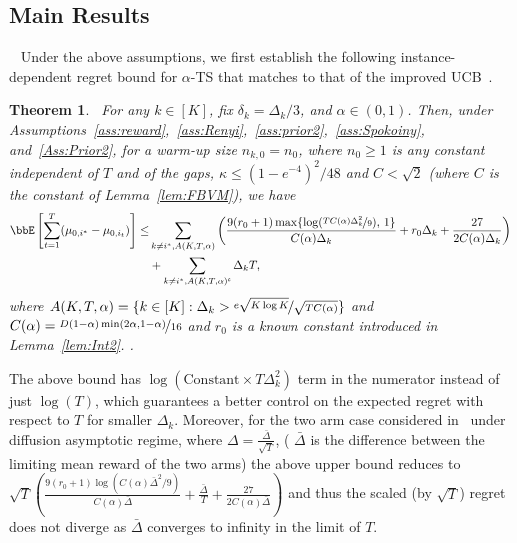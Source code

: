\documentclass[11pt]{article}
\newtheorem{theorem}{Theorem}
\begin{document}
\subsection{Main Results}~\label{sec:Main Results}
        Under the above assumptions, we first establish the following instance-dependent regret bound for $\alpha$-TS that matches to that of the improved UCB~\citep{Auer2010}.
        
        \begin{theorem}~\label{thm:PIRB0}
            For any $k\in[K]$, fix $\delta_k=\Delta_k/3$,  and $\alpha\in(0,1)$.   Then, under Assumptions~\ref{ass:reward},~\ref{ass:Renyi},~\ref{ass:prior2},~\ref{ass:Spokoiny}, and~\ref{Ass:Prior2},  for a warm-up size $n_{k,0} = n_0$, where $n_0 \geq 1$ is any constant independent of $T$ and of the gaps, $\kappa \leq (1-e^{-4})^2/48$ and $C < \sqrt{2}$ (where $C$ is the constant of Lemma~\ref{lem:FBVM}), we have
        \begin{align}
        \nonumber
            \bbE  \left[ \sum_{t=1}^{T} (\mu_{0,i^*} -  \mu_{0,i_t})  \right] 
            \leq&  \sum_{k\neq i^*, A(K,T,\alpha)} \left(\frac{9(r_0+1) \max\{\log(\nicefrac{T C(\alpha)\Delta_k^2}{9}),\,1\} }{C(\alpha)\Delta_k} + r_0 \Delta_k + \frac{27}{2 C(\alpha) \Delta_k}  \right)
            \nonumber
            \\
            & + \sum_{k\neq i^*, A(K,T,\alpha)^\mathtt{c}} \Delta_k T,
            \label{eq:TightPDUB}
        \end{align}
        where $A(K,T,\alpha)=\{k\in[K]:\Delta_k> \nicefrac{e\sqrt{K\log K}}{\sqrt{TC(\alpha)}}\}$ and $C(\alpha)=\nicefrac{D (1-\alpha) \min \left(2\alpha,1-\alpha  \right)}{16}$ and $r_0$ is a known constant introduced in Lemma~\ref{lem:Int2}.  .
        \end{theorem}
         The above bound has $\log(\text{Constant}\times T \Delta_k^2)$ term in the numerator instead of just $\log(T)$, which guarantees a better control on the expected regret with respect to $T$ for smaller $\Delta_k$. Moreover, for the two arm case considered in~\cite{Wager21} under diffusion asymptotic regime, where $\Delta = \frac{\bar \Delta}{\sqrt{T}}$, ( $\bar \Delta$ is the difference between the limiting mean reward of the two arms) the above upper bound reduces to  $\sqrt{T}\left(\frac{9(r_0+1) \log( C(\alpha)\bar \Delta^2/9)}{C(\alpha)\bar \Delta} + \frac{\bar \Delta}{T} + \frac{27}{2 C(\alpha) \bar \Delta}  \right)$ and thus the scaled (by $\sqrt{T}$) regret does not diverge as $\bar \Delta$ converges to infinity in the limit of $T$.~ %
           
\end{document}
